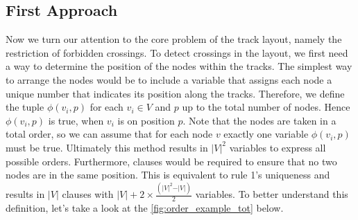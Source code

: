 \documentclass[bachelor, english]{algothesis}
\begin{document}
\subsection{First Approach}
Now we turn our attention to the core problem of the track layout, namely the restriction of forbidden crossings. To detect crossings in the layout, we first need a way to determine the position of the nodes within the tracks. The simplest way to arrange the nodes would be to include a variable that assigns each node a unique number that indicates its position along the tracks. Therefore, we define the tuple $\phi(v_i,p)$ for each $v_i \in V$ and $p$ up to the total number of nodes. Hence $\phi(v_i,p)$ is true, when $v_i$ is on position $p$. Note that the nodes are taken in a total order, so we can assume that for each node $v$ exactly one variable $\phi(v_i,p)$ must be true. Ultimately this method results in ${\vert V \vert}^2$ variables to express all possible orders. Furthermore, clauses would be required to ensure that no two nodes are in the same position. This is equivalent to rule 1's uniqueness and results in $\vert V \vert$ clauses with $\vert V \vert + 2 \times \frac{(\vert V \vert^2-\vert V \vert)}{2}$ variables. To better understand this definition, let's take a look at the \cref{fig:order_example_tot} below.
\end{document}
